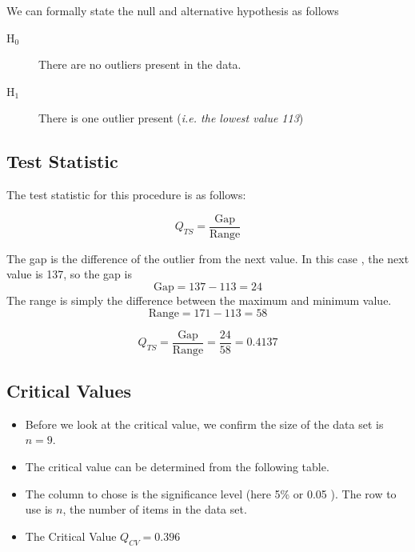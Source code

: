 We can formally state the null and alternative hypothesis as follows

\begin{description}
\item[H$_0$] There are no outliers present in the data.
\item[H$_1$] There is one outlier present (\textit{i.e. the lowest value 113})
\end{description}

\subsection*{Test Statistic}

The test statistic for this procedure is as follows:

\[ Q_{TS} =  \frac{\mbox{Gap}}{\mbox{Range}} \]

\noindent The gap is the difference of the outlier from the next value. In this case , the next value is 137, so the gap is 
\[ \mbox{Gap} = 137 - 113 = 24\]
The range is simply the difference between the maximum and minimum value.
\[ \mbox{Range} =  171-113 =58\]

\[ Q_{TS} =  \frac{\mbox{Gap}}{\mbox{Range}} = \frac{24}{58} = 0.4137 \]

\subsection*{Critical Values}

\begin{itemize}
    \item Before we look at the critical value, we confirm the size of the data set is $n=9$.

\item The critical value can be determined from the following table. 

\item  The column to chose is the significance level (here 5\% or 0.05 ). The row to use is $n$, the number of items in the data set.

\item The Critical Value $Q_{CV} = 0.396$
\end{itemize}


